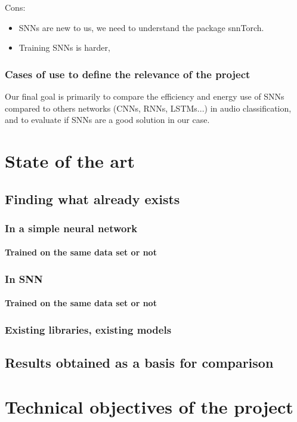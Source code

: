 \documentclass[11pt]{article}
\begin{document}
Cons:

\begin{itemize}
  \item SNNs are new to us, we need to understand the package snnTorch.
  \item Training SNNs is harder,
\end{itemize}

\subsubsection{Cases of use to define the relevance of the project}
Our final goal is primarily to compare the efficiency and energy use of SNNs compared to others networks (CNNs, RNNs, LSTMs...) in audio classification, and to evaluate if SNNs are a good solution in our case.

\section{State of the art}
\subsection{Finding what already exists}
\subsubsection{In a simple neural network}
\paragraph{Trained on the same data set or not}
\subsubsection{In SNN}
\paragraph{Trained on the same data set or not}
\subsubsection{Existing libraries, existing models}
\subsection{Results obtained as a basis for comparison}

\section{Technical objectives of the project}
\end{document}
